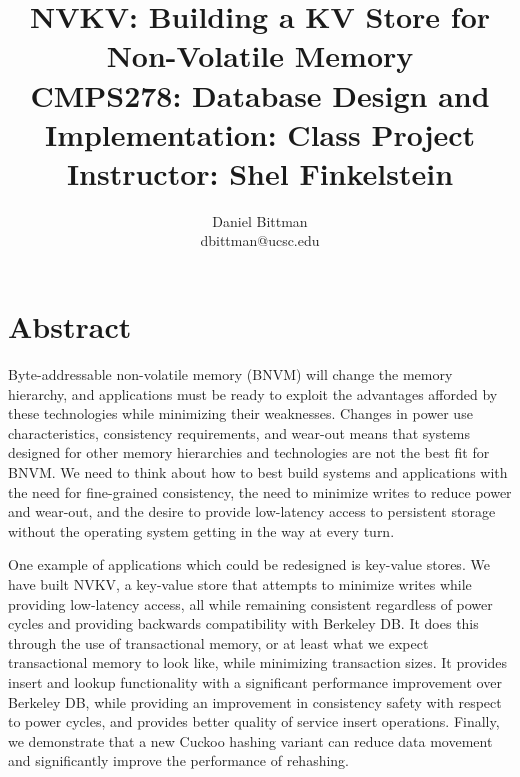 \documentclass[twocolumn,11pt]{article}
\author{Daniel Bittman \\ dbittman@ucsc.edu}
\title{NVKV: Building a KV Store for Non-Volatile Memory\\{\Large CMPS278:
Database Design and Implementation: Class Project\\\vspace{-2mm}Instructor: Shel Finkelstein}}
\newcommand{\bdb}{Berkeley DB\xspace}
\begin{document}
\biolinum
\maketitle
\libertine 
\renewcommand\ttdefault{lmtt}






\section*{Abstract}


Byte-addressable non-volatile memory (BNVM) will change the memory hierarchy, and
applications must be ready to exploit the advantages afforded by these
technologies while minimizing their weaknesses. Changes in power use
characteristics, consistency requirements, and wear-out means that systems
designed for other memory hierarchies and technologies are not the best fit for
BNVM. We need to think about how to best build systems and applications with the
need for fine-grained consistency, the need to minimize writes to reduce power
and wear-out, and the desire to provide low-latency access to persistent storage
without the operating system getting in the way at every turn.


One example of applications which could be redesigned is key-value stores. We
have built NVKV, a key-value store that attempts to minimize writes while
providing low-latency access, all while remaining consistent regardless of power
cycles and providing backwards compatibility with \bdb. It does this through the
use of transactional memory, or at least what we expect transactional memory to
look like, while minimizing transaction sizes. It provides insert and lookup
functionality with a significant performance improvement over \bdb, while
providing an improvement in consistency safety with respect to power cycles, and
provides better quality of service insert operations. Finally, we demonstrate
that a new Cuckoo hashing variant can reduce data movement and significantly improve the
performance of rehashing.
\end{document}

